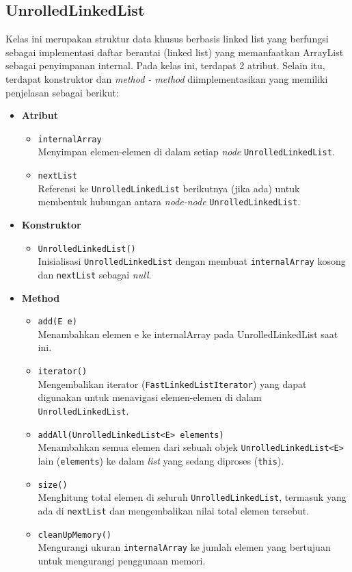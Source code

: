 \subsection{UnrolledLinkedList}
Kelas ini merupakan struktur data khusus berbasis linked list yang berfungsi sebagai implementasi daftar berantai (linked list) yang memanfaatkan ArrayList sebagai penyimpanan internal. Pada kelas ini, terdapat 2 atribut. Selain itu, terdapat konstruktor dan \textit{method - method} diimplementasikan yang memiliki penjelasan sebagai berikut:
\begin{itemize}
    \item \textbf{Atribut}
    \begin{itemize}
        \item \texttt{internalArray}
        \\ Menyimpan elemen-elemen di dalam setiap \textit{node} \texttt{UnrolledLinkedList}.
        \item \texttt{nextList}
        \\ Referensi ke \texttt{UnrolledLinkedList} berikutnya (jika ada) untuk membentuk hubungan antara \textit{node-node} \texttt{UnrolledLinkedList}.
    \end{itemize}

    \item \textbf{Konstruktor}
    \begin{itemize}
        \item \texttt{UnrolledLinkedList()}
        \\ Inisialisasi \texttt{UnrolledLinkedList} dengan membuat \texttt{internalArray} kosong dan \texttt{nextList} sebagai \textit{null}.
    \end{itemize}

    \item \textbf{Method}
    \begin{itemize}
        \item \texttt{add(E e)}
        \\Menambahkan elemen e ke internalArray pada UnrolledLinkedList saat ini.
        \newpage
        \item \texttt{iterator()}
        \\Mengembalikan iterator (\texttt{FastLinkedListIterator}) yang dapat digunakan untuk menavigasi elemen-elemen di dalam \texttt{UnrolledLinkedList}.
        \item \texttt{addAll(UnrolledLinkedList<E> elements)}
        \\ Menambahkan semua elemen dari sebuah objek \texttt{UnrolledLinkedList<E>} lain (\texttt{elements}) ke dalam \textit{list} yang sedang diproses (\texttt{this}).
        \item \texttt{size()}
        \\ Menghitung total elemen di seluruh \texttt{UnrolledLinkedList}, termasuk yang ada di \texttt{nextList} dan mengembalikan nilai total elemen tersebut.
        \item \texttt{cleanUpMemory()}
        \\Mengurangi ukuran \texttt{internalArray} ke jumlah elemen yang bertujuan untuk mengurangi penggunaan memori.
    \end{itemize}
\end{itemize}

